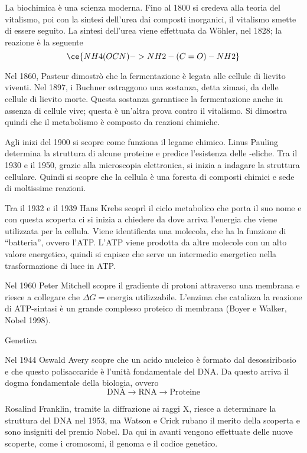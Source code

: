 La biochimica è una scienza moderna. Fino al 1800 si credeva alla teoria
del vitalismo, poi con la sintesi dell'urea dai composti inorganici, il
vitalismo smette di essere seguito. La sintesi dell'urea viene
effettuata da W\"ohler, nel 1828; la reazione è la seguente
\[
\ce{NH4(OCN) -> NH2-(C=O)-NH2}
\]

Nel 1860, Pasteur dimostrò che la fermentazione è legata alle cellule di
lievito viventi. Nel 1897, i Buchner estraggono una sostanza, detta
zimasi, da delle cellule di lievito morte. Questa sostanza garantisce la
fermentazione anche in assenza di cellule vive; questa è un'altra prova
contro il vitalismo. Si dimostra quindi che il metabolismo è composto da
reazioni chimiche.

Agli inizi del 1900 si scopre come funziona il legame chimico. Linus
Pauling determina la struttura di alcune proteine e predice l'esistenza
delle \alpha-eliche. Tra il 1930 e il 1950, grazie alla microscopia
elettronica, si inizia a indagare la struttura cellulare. Quindi si
scopre che la cellula è una foresta di composti chimici e sede di
moltissime reazioni.

Tra il 1932 e il 1939 Hans Krebs scoprì il ciclo metabolico che porta il
suo nome e con questa scoperta ci si inizia a chiedere da dove arriva
l'energia che viene utilizzata per la cellula. Viene identificata una
molecola, che ha la funzione di ``batteria'', ovvero l'ATP. L'ATP viene
prodotta da altre molecole con un alto valore energetico, quindi si
capisce che serve un intermedio energetico nella trasformazione di luce
in ATP.

Nel 1960 Peter Mitchell scopre il gradiente di protoni attraverso una
membrana e riesce a collegare che
\(\Delta G = \text{energia utilizzabile}\). L'enzima che catalizza la
reazione di ATP-sintasi è un grande complesso proteico di membrana
(Boyer e Walker, Nobel 1998).

Genetica

Nel 1944 Oswald Avery scopre che un acido nucleico è formato dal
desossiribosio e che questo polisaccaride è l'unità fondamentale del
DNA. Da questo arriva il dogma fondamentale della biologia, ovvero
\[
\text{DNA} \rightarrow \text{RNA} \rightarrow \text{Proteine}
\]

Rosalind Franklin, tramite la diffrazione ai raggi X, riesce a
determinare la struttura del DNA nel 1953, ma Watson e Crick rubano il
merito della scoperta e sono insigniti del premio Nobel. Da qui in
avanti vengono effettuate delle nuove scoperte, come i cromosomi, il
genoma e il codice genetico.

